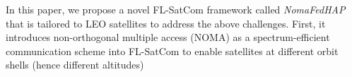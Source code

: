 \documentclass[letter,journal]{IEEEtran}
\newcommand{\blue}[1]{\textcolor{blue}{#1}}
\begin{document}
In this paper, we propose a novel FL-SatCom framework called \textit{NomaFedHAP} that is tailored to LEO satellites to address the above challenges. First, it introduces non-orthogonal multiple access (NOMA) as a spectrum-efficient communication scheme into FL-SatCom to enable satellites at different orbit shells (hence different altitudes) %
\end{document}
